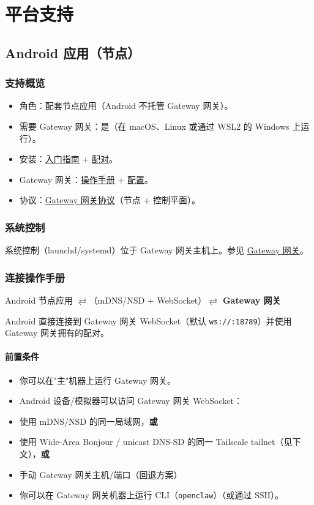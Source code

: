 \chapter{平台支持}

\section{Android 应用（节点）}


\subsection{支持概览}


\begin{itemize}
  \item 角色：配套节点应用（Android 不托管 Gateway 网关）。
  \item 需要 Gateway 网关：是（在 macOS、Linux 或通过 WSL2 的 Windows 上运行）。
  \item 安装：\href{/start/getting-started}{入门指南} + \href{/gateway/pairing}{配对}。
  \item Gateway 网关：\href{/gateway}{操作手册} + \href{/gateway/configuration}{配置}。
  \item 协议：\href{/gateway/protocol}{Gateway 网关协议}（节点 + 控制平面）。
\end{itemize}


\subsection{系统控制}


系统控制（launchd/systemd）位于 Gateway 网关主机上。参见 \href{/gateway}{Gateway 网关}。

\subsection{连接操作手册}


Android 节点应用 $\rightleftarrows$（mDNS/NSD + WebSocket）$\rightleftarrows$ \textbf{Gateway 网关}

Android 直接连接到 Gateway 网关 WebSocket（默认 \texttt{ws://:18789}）并使用 Gateway 网关拥有的配对。

\subsubsection{前置条件}


\begin{itemize}
  \item 你可以在"主"机器上运行 Gateway 网关。
  \item Android 设备/模拟器可以访问 Gateway 网关 WebSocket：
  \item 使用 mDNS/NSD 的同一局域网，\textbf{或}
  \item 使用 Wide-Area Bonjour / unicast DNS-SD 的同一 Tailscale tailnet（见下文），\textbf{或}
  \item 手动 Gateway 网关主机/端口（回退方案）
  \item 你可以在 Gateway 网关机器上运行 CLI（\texttt{openclaw}）（或通过 SSH）。
\end{itemize}



